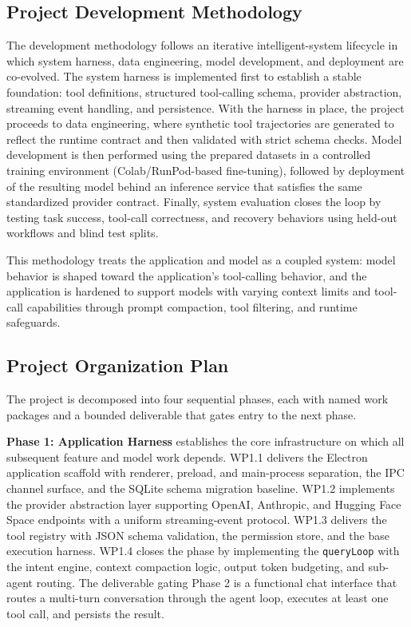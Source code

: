\documentclass[conference]{IEEEtran}
\begin{document}
\subsection{Project Development Methodology}
The development methodology follows an iterative intelligent-system lifecycle in which system harness, data engineering, model development, and deployment are co-evolved. The system harness is implemented first to establish a stable foundation: tool definitions, structured tool-calling schema, provider abstraction, streaming event handling, and persistence. With the harness in place, the project proceeds to data engineering, where synthetic tool trajectories are generated to reflect the runtime contract and then validated with strict schema checks. Model development is then performed using the prepared datasets in a controlled training environment (Colab/RunPod-based fine-tuning), followed by deployment of the resulting model behind an inference service that satisfies the same standardized provider contract. Finally, system evaluation closes the loop by testing task success, tool-call correctness, and recovery behaviors using held-out workflows and blind test splits.

This methodology treats the application and model as a coupled system: model behavior is shaped toward the application’s tool-calling behavior, and the application is hardened to support models with varying context limits and tool-call capabilities through prompt compaction, tool filtering, and runtime safeguards.

\subsection{Project Organization Plan}
The project is decomposed into four sequential phases, each with named work packages and a bounded deliverable that gates entry to the next phase.

\textbf{Phase 1: Application Harness} establishes the core infrastructure on which all subsequent feature and model work depends. WP1.1 delivers the Electron application scaffold with renderer, preload, and main-process separation, the IPC channel surface, and the SQLite schema migration baseline. WP1.2 implements the provider abstraction layer supporting OpenAI, Anthropic, and Hugging Face Space endpoints with a uniform streaming-event protocol. WP1.3 delivers the tool registry with JSON schema validation, the permission store, and the base execution harness. WP1.4 closes the phase by implementing the \texttt{queryLoop} with the intent engine, context compaction logic, output token budgeting, and sub-agent routing. The deliverable gating Phase 2 is a functional chat interface that routes a multi-turn conversation through the agent loop, executes at least one tool call, and persists the result.
\end{document}
